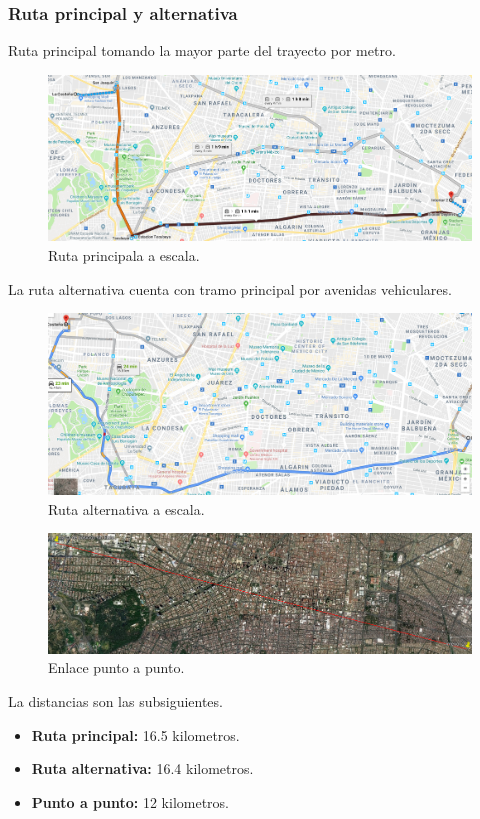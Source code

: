 \documentclass[12pt,letterpaper]{article}
\begin{document}
\subsubsection{Ruta principal y alternativa}
Ruta principal tomando la mayor parte del trayecto por metro.
\begin{figure}[ht]
    \centering
    \includegraphics[width=.9\textwidth]{imagenes/f2.png}
    \caption{Ruta principala a escala.}
\end{figure}

La ruta alternativa cuenta con tramo principal por avenidas 
vehiculares.
\begin{figure}[ht]
    \centering
    \includegraphics[width=.9\textwidth]{imagenes/f3.png}
    \caption{Ruta alternativa a escala.}
\end{figure}

\newpage
\begin{figure}[ht]
    \centering
    \includegraphics[width=.9\textwidth, angle=90]{imagenes/puntopunto.png}
    \caption{Enlace punto a punto.}
\end{figure}
La distancias son las subsiguientes.
\begin{itemize}
    \item \textbf{Ruta principal: } 16.5 kilometros.
    \item \textbf{Ruta alternativa: } 16.4 kilometros.
    \item \textbf{Punto a punto: } 12 kilometros.
\end{itemize}
\end{document}
